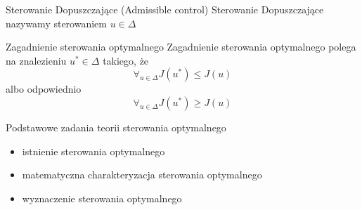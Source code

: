 \begin{definition}{Sterowanie Dopuszczające (Admissible control)}{}
    Sterowanie Dopuszczające nazywamy sterowaniem $u \in \Delta$
\end{definition}

\begin{definition}{Zagadnienie sterowania optymalnego}{}
    Zagadnienie sterowania optymalnego polega na znalezieniu $u^* \in \Delta$ takiego, że 
    $$\forall_{u \in \Delta} J(u^*) \leq J(u)$$
    albo odpowiednio
    $$\forall_{u \in \Delta} J(u^*) \geq J(u)$$
\end{definition}

\begin{note}{Podstawowe zadania teorii sterowania optymalnego}{}
    \begin{itemize}
        \item istnienie sterowania optymalnego
        \item matematyczna charakteryzacja sterowania optymalnego
        \item wyznaczenie sterowania optymalnego
    \end{itemize}
\end{note}
